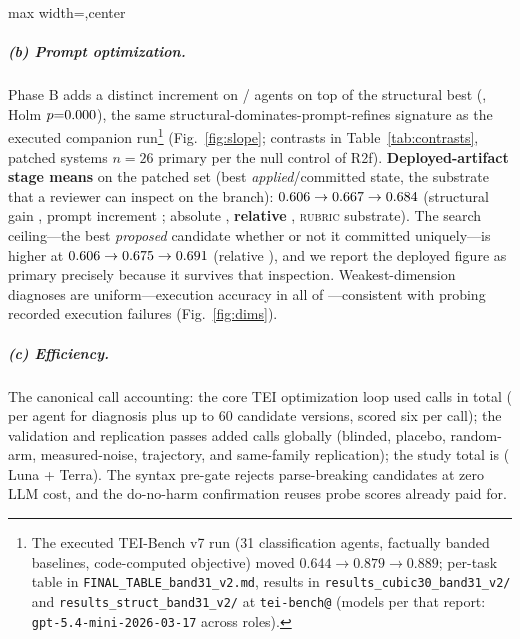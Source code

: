 \documentclass[11pt]{article}
\begin{document}
\begin{table}[t]\centering
\caption{Apply anatomy of \swVersions{} proposals (structural discipline of
the loop).}
\label{tab:apply}\footnotesize
\begin{adjustbox}{max width=\linewidth,center}\end{adjustbox}
\end{table}

\subparagraph{(b) Prompt optimization.}
Phase B adds a distinct increment on \swPromptAdds/\swN{} agents on top of the
structural best (\swDeltaFS{}, Holm $p{=}0.000$), the same
structural-dominates-prompt-refines signature as the executed companion
run\footnote{The executed TEI-Bench v7 run (31 classification agents,
factually banded baselines, code-computed objective) moved
$0.644\to0.879\to0.889$; per-task table in
\texttt{FINAL\_TABLE\_band31\_v2.md}, results in
\texttt{results\_cubic30\_band31\_v2/} and \texttt{results\_struct\_band31\_v2/}
at \texttt{tei-bench@\swTeibenchSHA} (models per that report:
\texttt{gpt-5.4-mini-2026-03-17} across roles).} (Fig.~\ref{fig:slope};
contrasts in Table~\ref{tab:contrasts}, patched systems $n{=}26$ primary
per the null control of R2f). \textbf{Deployed-artifact stage means} on the
patched set (best \emph{applied}/committed state, the substrate that a reviewer
can inspect on the branch): $0.606\to0.667\to0.684$
(structural gain \swAppStructGain, prompt increment \swAppPromptGain; absolute
\swAppAbsGain, \textbf{relative \swAppRelGain}, \textsc{rubric} substrate). The
search ceiling---the best \emph{proposed} candidate whether or not it committed
uniquely---is higher at $0.606\to0.675\to0.691$ (relative
\swPropRelGain), and we report the deployed figure as primary precisely because
it survives that inspection. Weakest-dimension diagnoses are uniform---execution
accuracy in all \swWeakEA{} of \swN{}---consistent with probing recorded
execution failures (Fig.~\ref{fig:dims}).

\subparagraph{(c) Efficiency.}
The canonical call accounting: the core TEI optimization loop used
\swCallsOpt{} calls in total (\swCallsOptPerAgent{} per agent for diagnosis
plus up to 60 candidate versions, scored six per call); the validation and
replication passes added \swCallsValidation{} calls globally (blinded,
placebo, random-arm, measured-noise, trajectory, and same-family
replication); the study total is \swCalls{} (\swLunaCalls{} Luna +
\swTerraCalls{} Terra). The syntax pre-gate rejects parse-breaking
candidates at zero LLM cost, and the do-no-harm confirmation reuses probe
scores already paid for.
\end{document}
